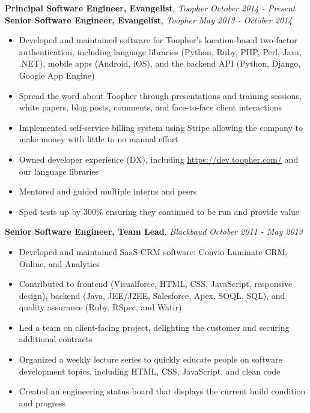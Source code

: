 \documentclass[9pt]{article}
\newenvironment{changemargin}[2]{%
  \begin{list}{}{%
    \setlength{\topsep}{0pt}%
    \setlength{\leftmargin}{#1}%
    \setlength{\rightmargin}{#2}%
    \setlength{\listparindent}{\parindent}%
    \setlength{\itemindent}{\parindent}%
    \setlength{\parsep}{\parskip}%
  }%
  \item[]}{\end{list}
}
\newcommand{\jobdescription}[1]{
	\begin{changemargin}{0.15in}{0.15in}
    \smallskip
		{#1}
    \medskip
	\end{changemargin}
}
\newcommand{\jobtitle}[3]{
	\textbf{#1}, \emph{#2} \hfill \emph{#3}\\
}
\newenvironment{body} {
	\vspace*{-16pt}
	\begin{changemargin}{-0.25in}{-0.5in}
  }	
	{\end{changemargin}
}
\begin{document}
\begin{body}
	\vspace{14pt}


  \jobtitle{Principal Software Engineer, Evangelist}{Toopher}{October 2014 - Present}
  \jobtitle{Senior Software Engineer, Evangelist}{Toopher}{May 2013 - October 2014}
  \jobdescription{
    \begin{itemize} \itemsep -0pt  %
      \item Developed and maintained software for Toopher's location-based two-factor authentication, including language libraries (Python, Ruby, PHP, Perl, Java, .NET), mobile apps (Android, iOS), and the backend API (Python, Django, Google App Engine)
      \item Spread the word about Toopher through presentations and training sessions, white papers, blog posts, comments, and face-to-face client interactions
      \item Implemented self-service billing system using Stripe allowing the company to make money with little to no manual effort
      \item Owned developer experience (DX), including \url{https://dev.toopher.com/} and our language libraries
      \item Mentored and guided multiple interns and peers
      \item Sped tests up by 300\% ensuring they continued to be run and provide value
    \end{itemize}
  }


  \jobtitle{Senior Software Engineer, Team Lead}{Blackbaud}{October 2011 - May 2013}
  \jobdescription{
  	\begin{itemize} \itemsep -0pt  %
  		\item Developed and maintained SaaS CRM software: Convio Luminate CRM, Online, and Analytics
      \item Contributed to frontend (Visualforce, HTML, CSS, JavaScript, responsive design), backend (Java, JEE/J2EE, Salesforce, Apex, SOQL, SQL), and quality assurance (Ruby, RSpec, and Watir)
      \item Led a team on client-facing project, delighting the customer and securing additional contracts
      \item Organized a weekly lecture series to quickly educate people on software development topics, including HTML, CSS, JavaScript, and clean code
      \item Created an engineering status board that displays the current build condition and progress
  	\end{itemize}
  }



\end{body}
\end{document}

